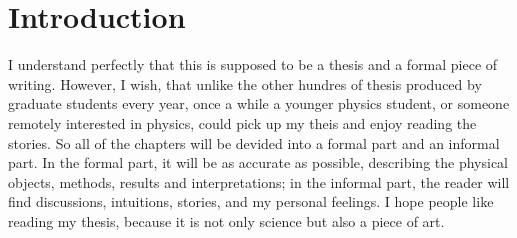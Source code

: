 \chapter{Introduction}
\label{introduction}
I understand perfectly that this is supposed to be a thesis and a formal piece of writing. However, I wish, that unlike the other hundres of thesis produced by graduate students every year, once a while a younger physics student, or someone remotely interested in physics, could pick up my theis and enjoy reading the stories. So all of the chapters will be devided into a formal part and an informal part. In the formal part, it will be as accurate as possible, describing the physical objects, methods, results and interpretations; in the informal part, the reader will find discussions, intuitions, stories, and my personal feelings. I hope people like reading my thesis, because it is not only science but also a piece of art.
